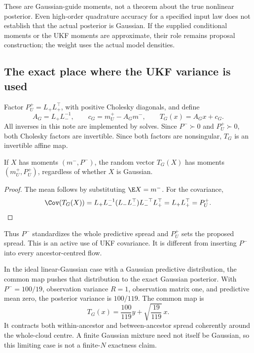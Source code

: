 These are Gaussian-guide moments, not a theorem about the true nonlinear
posterior. Even high-order quadrature accuracy for a specified input law
does not establish that the actual posterior is Gaussian. If the supplied
conditional moments or the UKF moments are approximate, their role remains
proposal construction; the weight uses the actual model densities.

\subsection{The exact place where the UKF variance is used}

Factor \(P_U^+=L_+L_+^\top\), with positive Cholesky diagonals, and define
\begin{equation}
\label{eq:bf-covariance-proposal-global-map}
 A_G=L_+L_-^{-1},\qquad c_G=m_U^+-A_Gm^-,
 \qquad T_G(x)=A_Gx+c_G .
\end{equation}
All inverses in this note are implemented by solves. Since \(P^-\succ0\)
and \(P_U^+\succ0\), both Cholesky factors are invertible. Since both factors
are nonsingular, \(T_G\) is an invertible affine map.

\begin{proposition}
If \(X\) has moments \((m^-,P^-)\), the random vector \(T_G(X)\) has
moments \((m_U^+,P_U^+)\), regardless of whether \(X\) is Gaussian.
\end{proposition}
\begin{proof}
The mean follows by substituting \(\E X=m^-\). For the covariance,
\begin{equation}
\label{eq:bf-covariance-proposal-global-covariance}
 \Cov(T_G(X))
 =L_+L_-^{-1}(L_-L_-^\top)L_-^{-\top}L_+^\top
 =L_+L_+^\top=P_U^+ .
\end{equation}
\end{proof}

Thus \(P^-\) standardizes the whole predictive spread and \(P_U^+\)
sets the proposed spread. This is an active use of UKF covariance.
It is different from inserting \(P^-\) into every ancestor-centred flow.

In the ideal linear-Gaussian case with a Gaussian predictive distribution,
the common map pushes that distribution to the exact Gaussian posterior.
With \(P^-=100/19\), observation variance \(R=1\), observation matrix one,
and predictive mean zero, the posterior variance is \(100/119\).
The common map is
\[
 T_G(x)=\frac{100}{119}y+\sqrt{\frac{19}{119}}\,x.
\]
It contracts both within-ancestor and between-ancestor spread coherently
around the whole-cloud centre. A finite Gaussian mixture need not itself
be Gaussian, so this limiting case is not a finite-\(N\) exactness claim.


